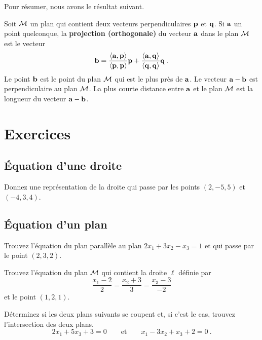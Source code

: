 {Pour résumer, nous avons le résultat suivant.

\begin{focus}{\dfn} 
Soit $\cal M$ un plan qui contient deux vecteurs perpendiculaires
$\mathbf{p}$ et $\mathbf{q}$.  Si $\mathbf{a}$ un point quelconque, la
{\bfseries projection (orthogonale)} du vecteur $\mathbf{a}$ dans le plan
$\cal M$ est le vecteur
\[
\mathbf{b} =  \frac{\left\langle{\mathbf{a}} , {\mathbf{p}}\right\rangle}{\left\langle{\mathbf{p}} , {\mathbf{p}}\right\rangle} \mathbf{p}
+ \frac{\left\langle{\mathbf{a}} , {\mathbf{q}}\right\rangle}{\left\langle{\mathbf{q}} , {\mathbf{q}}\right\rangle} \mathbf{q} \; .
\]
Le point $\mathbf{b}$ est le point du plan $\cal M$ qui est le plus près
de $\mathbf{a}$.  Le vecteur $\mathbf{a}-\mathbf{b}$ est perpendiculaire au
plan $\cal M$.  La plus courte distance entre $\mathbf{a}$ et le plan
$\cal M$ est la longueur du vecteur $\mathbf{a}-\mathbf{b}$.
\end{focus}

}  %

\section{Exercices}

\subsection{Équation d'une droite}

\begin{question}
Donnez une représentation de la droite qui passe par les points
$(2,-5,5)$ et $(-4,3,4)$.
\label{11Q1}\end{question}

\subsection{Équation d'un plan}

\begin{question}
Trouvez l'équation du plan parallèle au plan $2x_1 + 3x_2 - x_3 = 1$ et qui
passe par le point $(2,3,2)$.
\label{11Q2}
\end{question}

\begin{question}
Trouvez l'équation du plan $\cal M$ qui contient la droite $\ell$
définie par
\[
  \frac{x_1-2}{2} = \frac{x_2+3}{3} = \frac{x_3-3}{-2}
\]
et le point $(1,2,1)$.
\label{11Q3}
\end{question}

\begin{question}
Déterminez si les deux plans suivants se coupent et, si c'est le cas,
trouvez l'intersection des deux plans.
\[
 2x_1 + 5x_3  + 3 = 0 \qquad \text{et}  \qquad x_1 - 3x_2 + x_3 + 2 = 0 \ .
\]
\label{11Q4}
\end{question}

